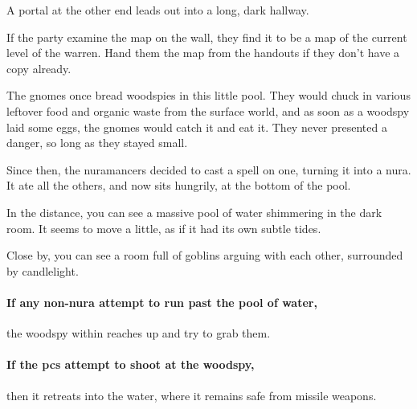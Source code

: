 \begin{multicols}{2}
\begin{boxtext}
  A portal at the other end leads out into a long, dark hallway.

\end{boxtext}

If the party examine the map on the wall, they find it to be a map of the current level of the warren.
Hand them the map from the handouts if they don't have a copy already.


\begin{exampletext}

  The gnomes once bread woodspies in this little pool.
  They would chuck in various leftover food and organic waste from the surface world, and as soon as a woodspy laid some eggs, the gnomes would catch it and eat it.
  They never presented a danger, so long as they stayed small.

  Since then, the nuramancers decided to cast a spell on one, turning it into a nura.
  It ate all the others, and now sits hungrily, at the bottom of the pool.

\end{exampletext}

\begin{boxtext}

  In the distance, you can see a massive pool of water shimmering in the dark room.
  It seems to move a little, as if it had its own subtle tides.

  Close by, you can see a room full of goblins arguing with each other, surrounded by candlelight.

\end{boxtext}


\paragraph{If any non-nura attempt to run past the pool of water,}
the woodspy within reaches up and try to grab them.

\paragraph{If the \glspl{pc} attempt to shoot at the woodspy,}
then it retreats into the water, where it remains safe from missile weapons.


\begin{exampletext}


\end{exampletext}
\end{multicols}
